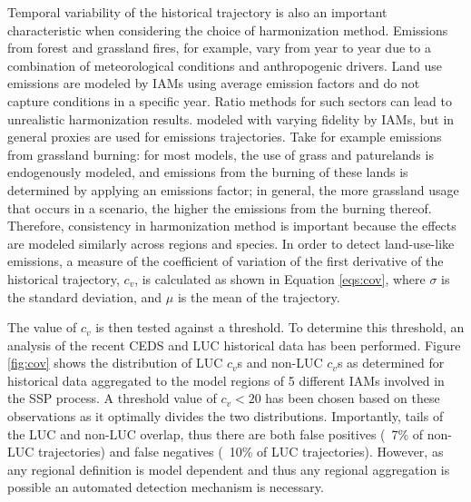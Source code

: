 Temporal variability of the historical trajectory is also an important characteristic
when considering the choice of harmonization method.  Emissions from forest and grassland fires, for example, vary from year to year due to a combination of meteorological conditions and anthropogenic drivers. Land use emissions are modeled by IAMs using average emission factors and do not capture conditions in a specific year.  Ratio methods for such sectors can lead to unrealistic harmonization results.
% 
% 
modeled with varying fidelity by IAMs, but in general proxies are used for
emissions trajectories. Take for example emissions from grassland burning: for
most models, the use of grass and paturelands is endogenously modeled, and
emissions from the burning of these lands is determined by applying an emissions
factor; in general, the more grassland usage that occurs in a scenario, the
higher the emissions from the burning thereof. Therefore, consistency in
harmonization method is important because the effects are modeled similarly
across regions and species. In order to detect land-use-like emissions,
% 
% 
% 
a measure of the coefficient of variation of the first derivative of the
historical trajectory, $c_v$, is calculated as shown in Equation \ref{eqs:cov},
where $\sigma$ is the standard deviation, and $\mu$ is the mean of the
trajectory.

The value of $c_v$ is then tested against a threshold. To determine this
threshold, an analysis of the recent CEDS and LUC historical data has been
performed. Figure \ref{fig:cov} shows the distribution of LUC $c_v$s and non-LUC
$c_v$s as determined for historical data aggregated to the model regions of 5
different IAMs involved in the SSP process. A threshold value of $c_v < 20$ has been
chosen based on these observations as it optimally divides the two
distributions. Importantly, tails of the LUC and non-LUC overlap, thus there are
both false positives (~7\% of non-LUC trajectories) and false negatives (~10\%
of LUC trajectories). However, as any regional definition is model dependent and
thus any regional aggregation is possible an automated detection mechanism is
necessary.

